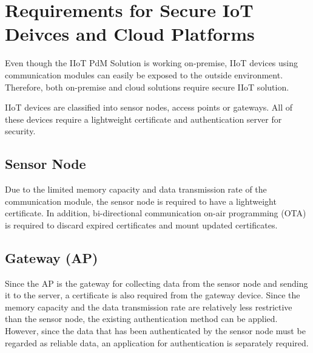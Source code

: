 \documentclass[11pt]{article}
\begin{document}
\section{Requirements for Secure IoT Deivces and Cloud Platforms}
Even though the IIoT PdM Solution is working on-premise, IIoT devices using communication modules can easily be exposed to the outside environment. Therefore, both on-premise and cloud solutions require secure IIoT solution. 

IIoT devices are classified into sensor nodes, access points or gateways. All of these devices require a lightweight certificate and authentication server for security.

\subsection{Sensor Node}

Due to the limited memory capacity and data transmission rate of the communication module, the sensor node is required to have a lightweight certificate. In addition, bi-directional communication on-air programming (OTA) is required to discard expired certificates and mount updated certificates.

\subsection{Gateway (AP)}
Since the AP is the gateway for collecting data from the sensor node and sending it to the server, a certificate is also required from the gateway device. Since the memory capacity and the data transmission rate are relatively less restrictive than the sensor node, the existing authentication method can be applied. However, since the data that has been authenticated by the sensor node must be regarded as reliable data, an application for authentication is separately required.
\end{document}
